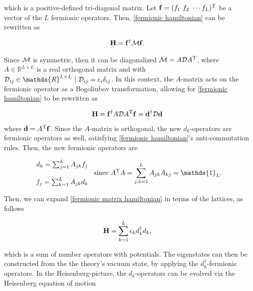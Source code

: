 \documentclass{homework}
\begin{document}
which is a positive-defined tri-diagonal matrix.
Let ${\bf f} = (f_1 \textnormal{ } f_2 \textnormal{ } \cdots f_L)^{\textnormal{T}}$ be a vector of the $L$ fermionic operators. Then, \eqref{fermionic hamiltonian} can be rewritten as 

\begin{align}
    {\bf H} = {\bf f}^\dagger \mathcal{M} {\bf f}.
\end{align}

Since $\mathcal{M}$ is symmetric, then it can be diagonalized  $\mathcal{M} = A \mathcal{D} A^{\textnormal{T}}$, where $A \in \mathds{R}^{L \times L}$ is a real orthogonal matrix and with $\mathcal{D}_{ij} \in \mathds{R}^{L \times L} \blanky | \blanky \mathcal{D}_{ij}  = \epsilon_i \delta_{ij}$. In this context, the $A$-matrix acts on the fermionic operator as a Bogoliubov transformation, allowing for \eqref{fermionic hamiltonian} to be rewritten as 

\begin{equation}
     {\bf H} = {\bf f}^\dagger A \mathcal{D} A^{\textnormal{T}} {\bf f} = {\bf d}^\dagger \mathcal{D} {\bf d}
     \label{fermionic matrix hamiltonian}
\end{equation}

where ${\bf d} = A^{\textnormal{T}} {\bf f}$. Since the $A$-matrix is orthogonal, the new $d_k$-operators are fermionic operators as well, satisfying \eqref{fermionic hamiltonian}'s anti-commutation rules. Then, the new fermionic operators are 

\begin{equation*}
    \begin{array}{c}
         d_k = \sum_{j=1}^{L} A_{jk} f_j  \\ 
         \\
         f_j = \sum_{k=1}^{L} A_{jk} d_k 
    \end{array} \textnormal{ since } A\transpose A = \sum_{j,k = 1}^{L} A_{jk} A_{kj} = \mathds{1}_{L}.
\end{equation*}

Then, we can expand \eqref{fermionic matrix hamiltonian} in terms of the lattices, as follows 

\begin{equation}
    {\bf H} = \sum_{k = 1}^{L} \epsilon_k d_k^\dagger d_k,
\end{equation}

which is a sum of number operators with potentials. The eigenstates can then be constructed from the the theory's vacuum state, by applying the $d_k^{\dagger}$-fermionic operators. In the Heisenberg-picture, the $d_k$-operators can be evolved via the Heisenberg equation of motion
\end{document}
